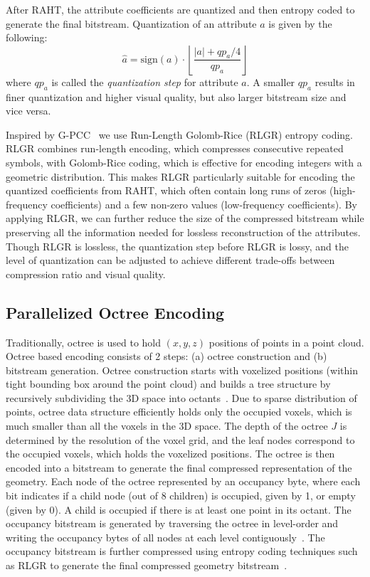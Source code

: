 %
After RAHT, the attribute coefficients are quantized and then entropy coded to generate the final bitstream.
%
Quantization of an attribute $a$ is given by the following:
% 
\[\hat{a} = \mathrm{sign}(a) \cdot \left\lfloor \frac{|a| + qp_a/4}{qp_a} \right\rfloor\]
%
where $qp_a$ is called the \textit{quantization step} for attribute $a$.
%
A smaller $qp_a$ results in finer quantization and higher visual quality, but also larger bitstream size and vice versa.

Inspired by G-PCC~\cite{gpcc}  we use Run-Length Golomb-Rice (RLGR) entropy coding.
%
%
RLGR combines run-length encoding, which compresses consecutive repeated symbols, with Golomb-Rice coding, which is effective for encoding integers with a geometric distribution.
%
This makes RLGR particularly suitable for encoding the quantized coefficients from RAHT, which often contain long runs of zeros (high-frequency coefficients) and a few non-zero values (low-frequency coefficients).
%
By applying RLGR, we can further reduce the size of the compressed bitstream while preserving all the information needed for lossless reconstruction of the attributes.
%
Though RLGR is lossless, the quantization step before RLGR is lossy, and the level of quantization can be adjusted to achieve different trade-offs between compression ratio and visual quality.

\subsection{Parallelized Octree Encoding}\label{sec:octree-encode-gpu}
Traditionally, octree is used to hold $(x,y,z)$ positions of points in a point cloud. 
%
Octree based encoding consists of 2 steps: (a) octree construction and (b) bitstream generation.
%
Octree construction starts with voxelized positions (within tight bounding box around the point cloud) and builds a tree structure by recursively subdividing the 3D space into octants~\cite{octree-orig1982,gpcc}.
%
Due to sparse distribution of points, octree data structure efficiently holds only the occupied voxels, which is much smaller than all the voxels in the 3D space.
%
The depth of the octree $J$ is determined by the resolution of the voxel grid, and the leaf nodes correspond to the occupied voxels, which holds the voxelized positions.
%
The octree is then encoded into a bitstream to generate the final compressed representation of the geometry.
%
Each node of the octree represented by an occupancy byte, where each bit indicates if a child node (out of 8 children) is occupied, given by 1, or empty (given by 0).
%
A child is occupied if there is at least one point in its octant.
%
The occupancy bitstream is generated by traversing the octree in level-order and writing the occupancy bytes of all nodes at each level contiguously~\cite{octree-comp2002,octree-comp2006}.
%
The occupancy bitstream is further compressed using entropy coding techniques such as RLGR to generate the final compressed geometry bitstream~\cite{gpcc}.

